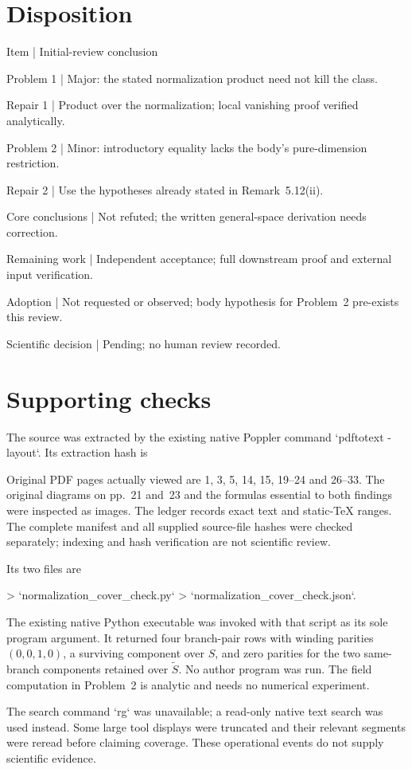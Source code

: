 \documentclass[10pt]{article}
\begin{document}
\section*{Disposition}
Item | Initial-review conclusion\par
Problem 1 | Major: the stated normalization product need not kill the class.\par
Repair 1 | Product over the normalization; local vanishing proof verified analytically.\par
Problem 2 | Minor: introductory equality lacks the body’s pure-dimension restriction.\par
Repair 2 | Use the hypotheses already stated in Remark 5.12(ii).\par
Core conclusions | Not refuted; the written general-space derivation needs correction.\par
Remaining work | Independent acceptance; full downstream proof and external input verification.\par
Adoption | Not requested or observed; body hypothesis for Problem 2 pre-exists this review.\par
Scientific decision | Pending; no human review recorded.\par
\section*{Supporting checks}
The source was extracted by the existing native Poppler command `pdftotext -layout`. Its extraction hash is\par
Original PDF pages actually viewed are 1, 3, 5, 14, 15, 19–24 and 26–33. The original diagrams on pp. 21 and 23 and the formulas essential to both findings were inspected as images. The ledger records exact text and static-TeX ranges. The complete manifest and all supplied source-file hashes were checked separately; indexing and hash verification are not scientific review.\par
Its two files are\par
> `normalization\_cover\_check.py`
> `normalization\_cover\_check.json`.\par
The existing native Python executable was invoked with that script as its sole program argument. It returned four branch-pair rows with winding parities \((0,0,1,0)\), a surviving component over \(S\), and zero parities for the two same-branch components retained over \(\widetilde S\). No author program was run. The field computation in Problem 2 is analytic and needs no numerical experiment.\par
The search command `rg` was unavailable; a read-only native text search was used instead. Some large tool displays were truncated and their relevant segments were reread before claiming coverage. These operational events do not supply scientific evidence.\par
\end{document}
